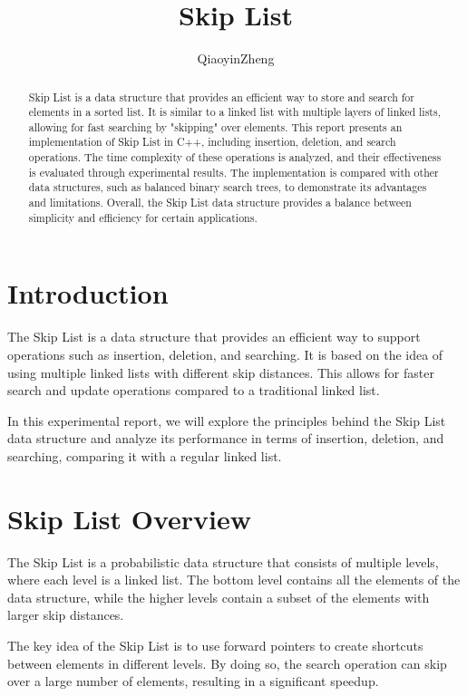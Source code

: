 \documentclass[12pt]{article}
\title{\bf{Skip List}}
\author{QiaoyinZheng}
\date{}
\begin{document}
\maketitle

\begin{abstract}
\begin{normalsize}
Skip List is a data structure that provides an efficient way to store and search for elements in a sorted list. It is similar to a linked list with multiple layers of linked lists, allowing for fast searching by "skipping" over elements. This report presents an implementation of Skip List in C++, including insertion, deletion, and search operations. The time complexity of these operations is analyzed, and their effectiveness is evaluated through experimental results. The implementation is compared with other data structures, such as balanced binary search trees, to demonstrate its advantages and limitations. Overall, the Skip List data structure provides a balance between simplicity and efficiency for certain applications.
\end{normalsize}
\end{abstract}

\newpage

\section{Introduction}
The Skip List is a data structure that provides an efficient way to support operations such as insertion, deletion, and searching. It is based on the idea of using multiple linked lists with different skip distances. This allows for faster search and update operations compared to a traditional linked list.

In this experimental report, we will explore the principles behind the Skip List data structure and analyze its performance in terms of insertion, deletion, and searching, comparing it with a regular linked list.

\section{Skip List Overview}
The Skip List is a probabilistic data structure that consists of multiple levels, where each level is a linked list. The bottom level contains all the elements of the data structure, while the higher levels contain a subset of the elements with larger skip distances.

The key idea of the Skip List is to use forward pointers to create shortcuts between elements in different levels. By doing so, the search operation can skip over a large number of elements, resulting in a significant speedup.
\end{document}
